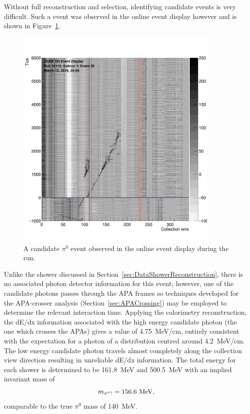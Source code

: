 Without full reconstruction and selection, identifying candidate events is very difficult.  Such a event was observed in the online event display however and is shown in Figure~\ref{fig:DataPi0Candidate}.
\begin{figure}[htb]
  \centering
  \includegraphics[width=10cm]{evd_run16110_subrun1_event29.png}
  \caption{A candidate $\pi^0$ event observed in the online event display during the run.}
  \label{fig:DataPi0Candidate}
\end{figure}
Unlike the shower discussed in Section~\ref{sec:DataShowerReconstruction}, there is no associated photon detector information for this event; however, one of the candidate photons passes through the APA frames so techniques developed for the APA-crosser analysis (Section~\ref{sec:APACrossing}) may be employed to determine the relevant interaction time.  Applying the calorimetry reconstruction, the dE/dx information associated with the high energy candidate photon (the one which crosses the APAs) gives a value of 4.75~MeV/cm, entirely consistent with the expectation for a photon of a distribution centred around 4.2~MeV/cm.  The low energy candidate photon travels almost completely along the collection view direction resulting in unreliable dE/dx information.  The total energy for each shower is determined to be 161.8~MeV and 500.5~MeV with an implied invariant mass of
\begin{equation}\label{eq:DataPi0CandidateMass}
m_{\pi^0?} = 156.6~\textnormal{MeV},
\end{equation}
comparable to the true $\pi^0$ mass of 140~MeV.

